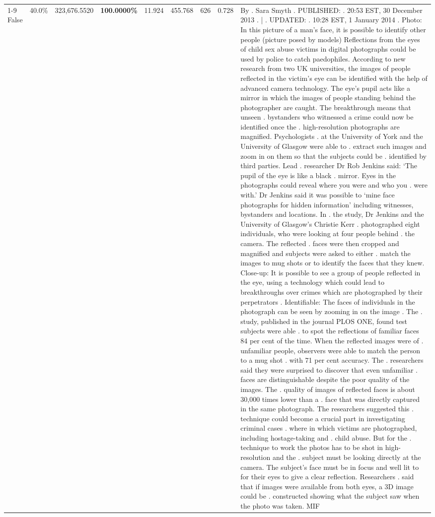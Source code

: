 \begin{table}[H]
\begin{tabular}{lllrlllll}
\cline{1-9}
False & 40.0\% & 323,676.5520 & \bfseries \color{red} 100.0000\% & 11.924 & 455.768 & 626 & 0.728 & By . Sara Smyth . PUBLISHED: . 20:53 EST, 30 December 2013 . | . UPDATED: . 10:28 EST, 1 January 2014 . Photo: In this picture of a man's face, it is possible to identify other people (picture posed by models) Reflections from the eyes of child sex abuse victims in digital photographs could be used by police to catch paedophiles. According to new research from two UK universities, the images of people reflected in the victim's eye can be identified with the help of advanced camera technology. The eye's pupil acts like a mirror in which the images of people standing behind the photographer are caught. The breakthrough means that unseen . bystanders who witnessed a crime could now be identified once the . high-resolution photographs are magnified. Psychologists . at the University of York and the University of Glasgow were able to . extract such images and zoom in on them so that the subjects could be . identified by third parties. Lead . researcher Dr Rob Jenkins said: ‘The pupil of the eye is like a black . mirror. Eyes in the photographs could reveal where you were and who you . were with.' Dr Jenkins said it was possible to ‘mine face photographs for hidden information' including witnesses, bystanders and locations. In . the study, Dr Jenkins and the University of Glasgow's Christie Kerr . photographed eight individuals, who were looking at four people behind . the camera. The reflected . faces were then cropped and magnified and subjects were asked to either . match the images to mug shots or to identify the faces that they knew. Close-up: It is possible to see a group of people reflected in the eye, using a technology which could lead to breakthroughs over crimes which are photographed by their perpetrators . Identifiable: The faces of individuals in the photograph can be seen by zooming in on the image . The . study, published in the journal PLOS ONE, found test subjects were able . to spot the reflections of familiar faces 84 per cent of the time. When the reflected images were of . unfamiliar people, observers were able to match the person to a mug shot . with 71 per cent accuracy. The . researchers said they were surprised to discover that even unfamiliar . faces are distinguishable despite the poor quality of the images. The . quality of images of reflected faces is about 30,000 times lower than a . face that was directly captured in the same photograph. The researchers suggested this . technique could become a crucial part in investigating criminal cases . where in which victims are photographed, including hostage-taking and . child abuse. But for the . technique to work the photos has to be shot in high-resolution and the . subject must be looking directly at the camera. The subject's face must be in focus and well lit to for their eyes to give a clear reflection. Researchers . said that if images were available from both eyes, a 3D image could be . constructed showing what the subject saw when the photo was taken. MIF \\

\end{tabular}
\end{table}

